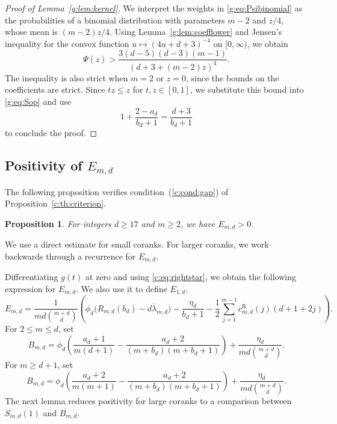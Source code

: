 \documentclass[11pt]{article}
\numberwithin{equation}{section}
\newtheorem{proposition}[theorem]{Proposition}
\theoremstyle{remark}\newtheorem{remark}[theorem]{Remark}
\begin{document}
\begin{proof}[Proof of Lemma~\ref{g:lem:kernel}]
We interpret the weights in \eqref{g:eq:Psibinomial} as the probabilities of a
binomial distribution with parameters $m-2$ and $z/4$, whose mean is
$(m-2)z/4$. Using Lemma~\ref{g:lem:coefflower} and Jensen's inequality
for the convex function $u\mapsto(4u+d+3)^{-4}$ on $[0,\infty)$,
we obtain
\[
 \Psi(z)>
 \frac{3(d-5)(d-3)(m-1)}{(d+3+(m-2)z)^4}.
\]
The inequality is also strict when $m=2$ or $z=0$, since the bounds
on the coefficients are strict.
Since $tz\le z$ for $t,z\in[0,1]$, we substitute this bound into
\eqref{g:eq:Sop} and use
\[
 1+\frac{2-a_d}{b_d+1}=\frac{d+3}{b_d+1}
\]
to conclude the proof.
\end{proof}

\subsection{Positivity of \texorpdfstring{$E_{m,d}$}{E}}\label{sec:positivity}
The following proposition verifies condition~(\ref{c:cond:gap}) of
Proposition~\ref{c:th:criterion}.

\begin{proposition}\label{g:th:gap}
For integers $d\ge17$ and $m\ge2$, we have $E_{m,d}>0$.
\end{proposition}

We use a direct estimate for small coranks. For larger coranks,
we work backwards through a recurrence for $E_{m,d}$.

Differentiating $g(t)$ at zero and using \eqref{c:eq:rightstar}, we obtain
the following expression for $E_{m,d}$. We also use it to define $E_{1,d}$.
\begin{equation}\label{g:eq:gap}
 E_{m,d}
 =\frac{1}{md\binom{m+d}{d}}\left(
 \phi_d\bigl(R_{m,d}(b_d)-d\bar\lambda_{m,d}\bigr)
 -\frac{\eta_d}{b_d+1}
 -\frac12\sum_{j=1}^{m-1}c_{m,d}^{\mathrm R}(j)(d+1+2j)\right).
\end{equation}
For $2\le m\le d$, set
\begin{equation}\label{g:eq:B}
 B_{m,d}=\phi_d\left(\frac{a_d+1}{m(d+1)}
 -\frac{a_d+2}{(m+b_d)(m+b_d+1)}\right)
 +\frac{\eta_d}{md\binom{m+d}{d}}.
\end{equation}
For $m\ge d+1$, set
\begin{equation}\label{g:eq:Blarge}
 B_{m,d}=\phi_d\left(\frac{a_d+2}{m(m+1)}
 -\frac{a_d+2}{(m+b_d)(m+b_d+1)}\right)
 +\frac{\eta_d}{md\binom{m+d}{d}}.
\end{equation}
The next lemma reduces positivity for large coranks to a comparison
between $S_{m,d}(1)$ and $B_{m,d}$.
\end{document}
